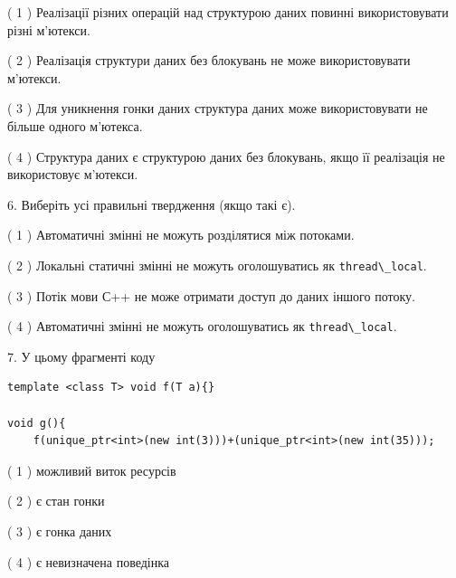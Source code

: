 \documentclass[12pt, ukrainian]{article}
\def\code#1{\Verb!#1!}
\begin{document}
\begin {large}
{( 1 ) Реалізації різних операцій над структурою даних повинні використовувати різні м’ютекси.%

( 2 ) Реалізація структури даних без блокувань не може використовувати м’ютекси.%

( 3 ) Для уникнення гонки даних структура даних може використовувати не більше одного м’ютекса.%

( 4 ) Структура даних є структурою даних без блокувань, якщо її реалізація не використовує м’ютекси.%
\newpage



\vspace{5mm}
6. Виберіть усі правильні твердження (якщо такі є).\par
\vspace{2mm}

( 1 ) Автоматичні змінні не можуть розділятися між потоками.%

( 2 ) Локальні статичні змінні не можуть оголошуватись як \code{thread\_local}.%

( 3 ) Потік мови С++ не може отримати доступ до даних іншого потоку.%

( 4 ) Автоматичні змінні не можуть оголошуватись як \code{thread\_local}.%


\vspace{5mm}
7. У цьому фрагменті коду
\begin{verbatim}
template <class T> void f(T a){}

void g(){
    f(unique_ptr<int>(new int(3)))+(unique_ptr<int>(new int(35)));
\end{verbatim}

( 1 ) можливий виток ресурсів%

( 2 ) є стан гонки%

( 3 ) є гонка даних%

( 4 ) є невизначена поведінка%
}
\end {large}

\vspace{4mm}
\newpage
\end{document}
